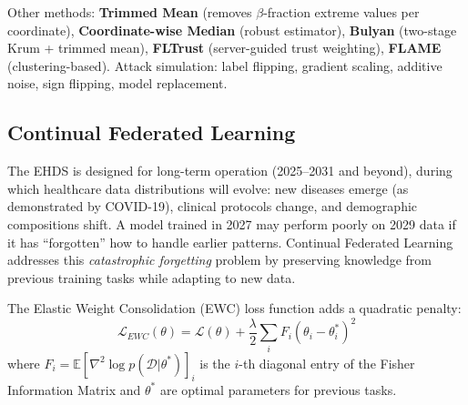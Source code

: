 \documentclass[conference]{IEEEtran}
\begin{document}
\begin{figure}[htbp]
\centering
{}
\end{figure}

Other methods: \textbf{Trimmed Mean} (removes $\beta$-fraction extreme values per coordinate), \textbf{Coordinate-wise Median} (robust estimator), \textbf{Bulyan} (two-stage Krum + trimmed mean), \textbf{FLTrust} (server-guided trust weighting), \textbf{FLAME} (clustering-based). Attack simulation: label flipping, gradient scaling, additive noise, sign flipping, model replacement.

\subsection{Continual Federated Learning}

The EHDS is designed for long-term operation (2025--2031 and beyond), during which healthcare data distributions will evolve: new diseases emerge (as demonstrated by COVID-19), clinical protocols change, and demographic compositions shift. A model trained in 2027 may perform poorly on 2029 data if it has ``forgotten'' how to handle earlier patterns. Continual Federated Learning addresses this \textit{catastrophic forgetting} problem by preserving knowledge from previous training tasks while adapting to new data.

The Elastic Weight Consolidation (EWC) loss function adds a quadratic penalty:
\[
\mathcal{L}_{EWC}(\theta) = \mathcal{L}(\theta) + \frac{\lambda}{2} \sum_i F_i (\theta_i - \theta_i^*)^2
\]
where $F_i = \mathbb{E}[\nabla^2 \log p(\mathcal{D}|\theta^*)]_i$ is the $i$-th diagonal entry of the Fisher Information Matrix and $\theta^*$ are optimal parameters for previous tasks.
\end{document}
